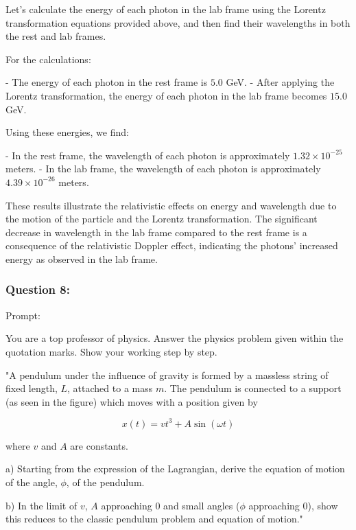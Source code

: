 \documentclass[a4paper,11pt]{article}
\begin{document}
Let's calculate the energy of each photon in the lab frame using the Lorentz transformation equations provided above, and then find their wavelengths in both the rest and lab frames.

For the calculations:

- The energy of each photon in the rest frame is \(5.0\) GeV.
- After applying the Lorentz transformation, the energy of each photon in the lab frame becomes \(15.0\) GeV.

Using these energies, we find:

- In the rest frame, the wavelength of each photon is approximately \(1.32 \times 10^{-25}\) meters.
- In the lab frame, the wavelength of each photon is approximately \(4.39 \times 10^{-26}\) meters.

These results illustrate the relativistic effects on energy and wavelength due to the motion of the particle and the Lorentz transformation. The significant decrease in wavelength in the lab frame compared to the rest frame is a consequence of the relativistic Doppler effect, indicating the photons' increased energy as observed in the lab frame.

\subsubsection*{Question 8:}

Prompt:
\begin{spverbatim}
    You are a top professor of physics. Answer the physics problem given within the quotation marks. Show your working step by step.

    "A pendulum under the influence of gravity is formed by a massless string of fixed length, \( L \), attached to a mass \( m \). The pendulum is connected to a support (as seen in the figure) which moves with a position given by 

    \[ x(t) = v t^3 + A \sin(\omega t) \]
    
    where \( v \) and \( A \) are constants.
    
    a) Starting from the expression of the Lagrangian, derive the equation of motion of the angle, \( \phi \), of the pendulum. 
    
    b) In the limit of \( v \), \(A\) approaching 0 and small angles (\( \phi \) approaching 0), show this reduces to the classic pendulum problem and equation of motion."
\end{spverbatim}

\bigskip
\end{document}
